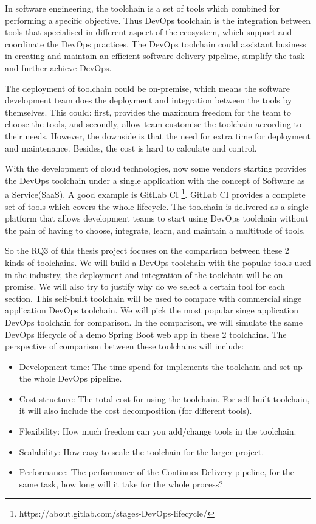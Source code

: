 In software engineering, the toolchain is a set of tools which combined for performing a specific objective. Thus DevOps toolchain is the integration between tools that specialised in different aspect of the ecosystem, which support and coordinate the DevOps practices. The DevOps toolchain could assistant business in creating and maintain an efficient software delivery pipeline, simplify the task and further achieve DevOps.\cite{DevOpsto7:online}\cite{Toolchai10:online}
\par
The deployment of toolchain could be on-premise, which means the software development team does the deployment and integration between the tools by themselves. This could: first, provides the maximum freedom for the team to choose the tools, and secondly, allow team customise the toolchain according to their needs. However, the downside is that the need for extra time for deployment and maintenance. Besides, the cost is hard to calculate and control. 
\par
With the development of cloud technologies, now some vendors starting provides the DevOps toolchain under a single application with the concept of Software as a Service(SaaS). A good example is GitLab CI \footnote{https://about.gitlab.com/stages-DevOps-lifecycle/}. GitLab CI provides a complete set of tools which covers the whole lifecycle. The toolchain is delivered as a single platform that allows development teams to start using DevOps toolchain without the pain of having to choose, integrate, learn, and maintain a multitude of tools. \cite{TheDevOp71:online}
\par
So the RQ3 of this thesis project focuses on the comparison between these 2 kinds of toolchains. We will build a DevOps toolchain with the popular tools used in the industry, the deployment and integration of the toolchain will be on-promise. We will also try to justify why do we select a certain tool for each section. This self-built toolchain will be used to compare with commercial singe application DevOps toolchain. We will pick the most popular singe application DevOps toolchain for comparison. In the comparison, we will simulate the same DevOps lifecycle of a demo Spring Boot web app in these 2 toolchains. The perspective of comparison between these toolchains will include:
\begin{itemize}
    \item Development time: The time spend for implements the toolchain and set up the whole DevOps pipeline.
    \item Cost structure: The total cost for using the toolchain. For self-built toolchain, it will also include the cost decomposition (for different tools).
    \item Flexibility: How much freedom can you add/change tools in the toolchain.
    \item Scalability: How easy to scale the toolchain for the larger project.
    \item Performance: The performance of the Continues Delivery pipeline, for the same task, how long will it take for the whole process?
\end{itemize}

